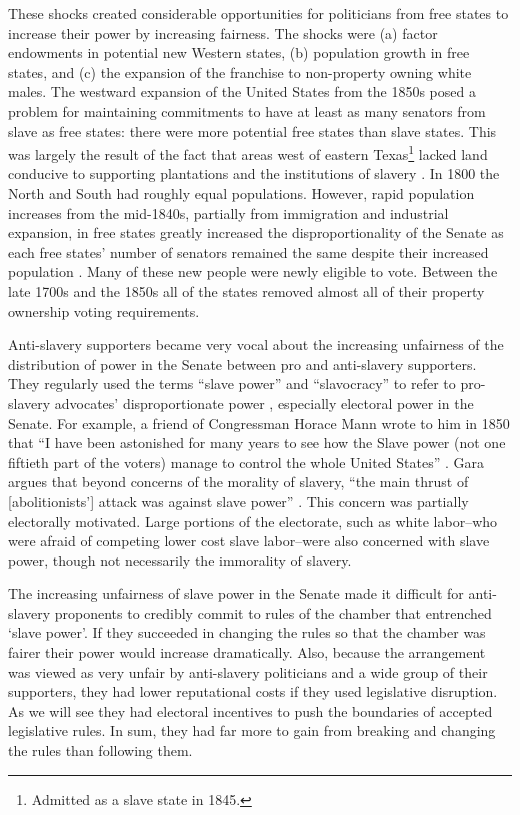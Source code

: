 \documentclass[a4paper]{article}\usepackage[]{graphicx}\usepackage[]{color}
\begin{document}
These shocks created considerable opportunities for politicians from free states to increase their power by increasing fairness. The shocks were (a) factor endowments in potential new Western states, (b) population growth in free states, and (c) the expansion of the franchise to non-property owning white males.  The westward expansion of the United States from the 1850s posed a problem for maintaining commitments to have at least as many senators from slave as free states: there were more potential free states than slave states. This was largely the result of the fact that areas west of eastern Texas\footnote{Admitted as a slave state in 1845.} lacked land conducive to supporting plantations and the institutions of slavery \cite[]{Ramsdell1929,Weingast1998}. In 1800 the North and South had roughly equal populations. However, rapid population increases from the mid-1840s, partially from immigration and industrial expansion, in free states greatly increased the disproportionality of the Senate as each free states' number of senators remained the same despite their increased population \cite[184]{Weingast1998}. Many of these new people were newly eligible to vote. Between the late 1700s and the 1850s all of the states removed almost all of their property ownership voting requirements.

Anti-slavery supporters became very vocal about the increasing unfairness of the distribution of power in the Senate between pro and anti-slavery supporters. They regularly used the terms ``slave power'' and ``slavocracy'' to refer to pro-slavery advocates' disproportionate power \citep{richards2000}, especially electoral power in the Senate. For example, a friend of Congressman Horace Mann wrote to him in 1850 that ``I have been astonished for many years to see how the Slave power (not one fiftieth part of the voters) manage to control the whole United States'' \citep[quoted in][6]{Gara1969}. Gara argues that beyond concerns of the morality of slavery, ``the main thrust of [abolitionists'] attack was against slave power'' \citeyearpar[6]{Gara1969}. This concern was partially electorally motivated. Large portions of the electorate, such as white labor--who were afraid of competing lower cost slave labor--were also concerned with slave power, though not necessarily the immorality of slavery.

The increasing unfairness of slave power in the Senate made it difficult for anti-slavery proponents to credibly commit to rules of the chamber that entrenched `slave power'. If they succeeded in changing the rules so that the chamber was fairer their power would increase dramatically. Also, because the arrangement was viewed as very unfair by anti-slavery politicians and a wide group of their supporters, they had lower reputational costs if they used legislative disruption. As we will see they had electoral incentives to push the boundaries of accepted legislative rules. In sum, they had far more to gain from breaking and changing the rules than following them.
\end{document}
